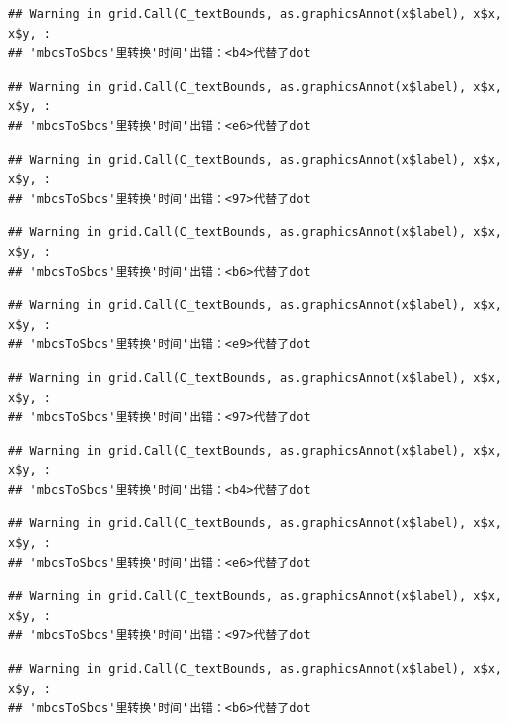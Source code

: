 \documentclass[
]{article}
\begin{document}
\begin{verbatim}
## Warning in grid.Call(C_textBounds, as.graphicsAnnot(x$label), x$x, x$y, :
## 'mbcsToSbcs'里转换'时间'出错：<b4>代替了dot
\end{verbatim}

\begin{verbatim}
## Warning in grid.Call(C_textBounds, as.graphicsAnnot(x$label), x$x, x$y, :
## 'mbcsToSbcs'里转换'时间'出错：<e6>代替了dot
\end{verbatim}

\begin{verbatim}
## Warning in grid.Call(C_textBounds, as.graphicsAnnot(x$label), x$x, x$y, :
## 'mbcsToSbcs'里转换'时间'出错：<97>代替了dot
\end{verbatim}

\begin{verbatim}
## Warning in grid.Call(C_textBounds, as.graphicsAnnot(x$label), x$x, x$y, :
## 'mbcsToSbcs'里转换'时间'出错：<b6>代替了dot
\end{verbatim}

\begin{verbatim}
## Warning in grid.Call(C_textBounds, as.graphicsAnnot(x$label), x$x, x$y, :
## 'mbcsToSbcs'里转换'时间'出错：<e9>代替了dot
\end{verbatim}

\begin{verbatim}
## Warning in grid.Call(C_textBounds, as.graphicsAnnot(x$label), x$x, x$y, :
## 'mbcsToSbcs'里转换'时间'出错：<97>代替了dot
\end{verbatim}

\begin{verbatim}
## Warning in grid.Call(C_textBounds, as.graphicsAnnot(x$label), x$x, x$y, :
## 'mbcsToSbcs'里转换'时间'出错：<b4>代替了dot
\end{verbatim}

\begin{verbatim}
## Warning in grid.Call(C_textBounds, as.graphicsAnnot(x$label), x$x, x$y, :
## 'mbcsToSbcs'里转换'时间'出错：<e6>代替了dot
\end{verbatim}

\begin{verbatim}
## Warning in grid.Call(C_textBounds, as.graphicsAnnot(x$label), x$x, x$y, :
## 'mbcsToSbcs'里转换'时间'出错：<97>代替了dot
\end{verbatim}

\begin{verbatim}
## Warning in grid.Call(C_textBounds, as.graphicsAnnot(x$label), x$x, x$y, :
## 'mbcsToSbcs'里转换'时间'出错：<b6>代替了dot
\end{verbatim}
\end{document}
